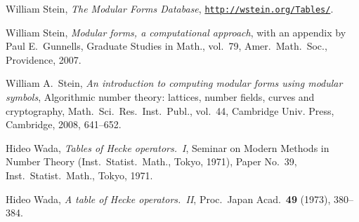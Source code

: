 \documentclass[11pt]{amsart}
\numberwithin{equation}{subsection}
\theoremstyle{plain}
\theoremstyle{definition}
\begin{document}
\begin{thebibliography}{999}
William Stein, \emph{The Modular Forms Database}, \href{http://wstein.org/Tables/}{\texttt{http://wstein.org/Tables/}}.

William Stein, \emph{Modular forms, a computational approach}, with an appendix by Paul E.\ Gunnells, Graduate Studies in Math., vol.~79, Amer.\ Math.\ Soc., Providence, 2007.

William A.\ Stein, \emph{An introduction to computing modular forms using modular symbols}, Algorithmic number theory: lattices, number fields, curves and cryptography, Math.\ Sci.\ Res.\ Inst.\ Publ., vol.\ 44, Cambridge Univ. Press, Cambridge, 2008, 641--652.

Hideo Wada, \emph{Tables of Hecke operators.\ I}, Seminar on Modern Methods in Number Theory (Inst.\ Statist.\ Math., Tokyo, 1971), Paper No.\ 39, Inst.\ Statist.\ Math., Tokyo, 1971. 

Hideo Wada, \emph{A table of Hecke operators.\ II}, Proc.\ Japan Acad.\ \textbf{49} (1973), 380--384. 

\end{thebibliography}
\end{document}

